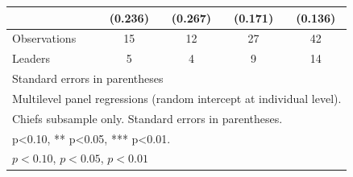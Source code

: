 \begin{table}[htbp]
\begin{tabular}{l*{4}{c}}
            &     (0.236)         &     (0.267)         &     (0.171)         &     (0.136)         \\
\midrule
Observations&          15         &          12         &          27         &          42         \\
Leaders     &           5         &           4         &           9         &          14         \\
\bottomrule
\multicolumn{5}{l}{\footnotesize Standard errors in parentheses}\\
\multicolumn{5}{l}{\footnotesize Multilevel panel regressions (random intercept at individual level).}\\
\multicolumn{5}{l}{\footnotesize Chiefs subsample only. Standard errors in parentheses.}\\
\multicolumn{5}{l}{\footnotesize * p<0.10, ** p<0.05, *** p<0.01.}\\
\multicolumn{5}{l}{\footnotesize \sym{*} \(p<0.10\), \sym{**} \(p<0.05\), \sym{***} \(p<0.01\)}\\
\end{tabular}
\end{table}
